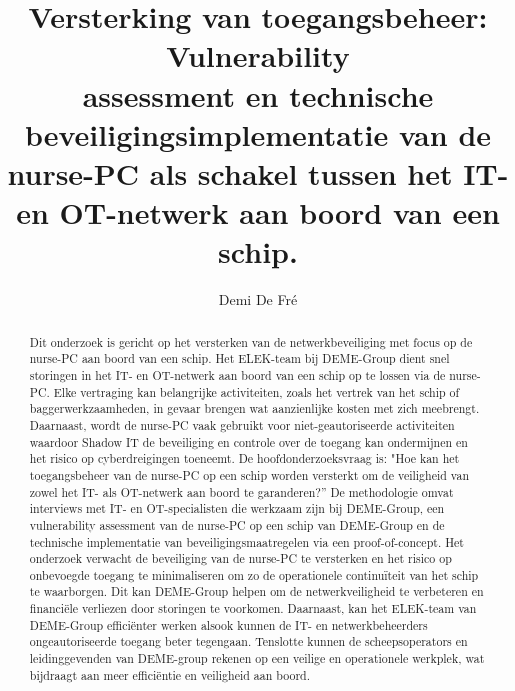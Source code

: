 \documentclass{hogent-article}
\title{Versterking van toegangsbeheer: Vulnerability \\ assessment en technische beveiligingsimplementatie van de nurse-PC als schakel tussen het IT- en OT-netwerk aan boord van een schip.}
\author{Demi De Fré}
\begin{document}
\begin{abstract}
  Dit onderzoek is gericht op het versterken van de netwerkbeveiliging met focus op de nurse-PC aan boord van een schip. Het ELEK-team bij DEME-Group 
  dient snel storingen in het IT- en OT-netwerk aan boord van een schip  op te lossen via de nurse-PC. Elke vertraging kan belangrijke activiteiten, 
  zoals het vertrek van het schip of baggerwerkzaamheden, in gevaar brengen wat aanzienlijke kosten met zich meebrengt. Daarnaast, wordt de nurse-PC vaak 
  gebruikt voor niet-geautoriseerde activiteiten waardoor Shadow IT de beveiliging en controle over de toegang kan ondermijnen en het risico op cyberdreigingen 
  toeneemt. De hoofdonderzoeksvraag is: "Hoe kan het toegangsbeheer van de nurse-PC op een schip worden versterkt om de veiligheid van zowel het IT- als OT-netwerk 
  aan boord te garanderen?” De methodologie omvat interviews met IT- en OT-specialisten die werkzaam zijn bij DEME-Group, een vulnerability assessment van 
  de nurse-PC op een schip van DEME-Group en de technische implementatie van beveiligingsmaatregelen via een proof-of-concept. Het onderzoek verwacht de 
  beveiliging van de nurse-PC te versterken en het risico op onbevoegde toegang te minimaliseren om zo de operationele continuïteit van het schip te waarborgen. 
  Dit kan DEME-Group helpen om de netwerkveiligheid te verbeteren en financiële verliezen door storingen te voorkomen. Daarnaast, kan het ELEK-team van DEME-Group 
  efficiënter werken alsook kunnen de  IT- en netwerkbeheerders ongeautoriseerde toegang beter tegengaan. Tenslotte kunnen de scheepsoperators en leidinggevenden 
  van DEME-group rekenen op een veilige en operationele werkplek, wat bijdraagt aan meer efficiëntie en veiligheid aan boord.
\end{abstract}

\tableofcontents


\end{document}

